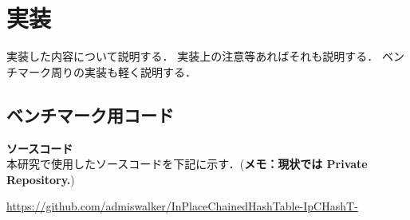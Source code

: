 \chapter{実装}
\label{chap_Implementation}

実装した内容について説明する．
実装上の注意等あればそれも説明する．
ベンチマーク周りの実装も軽く説明する．
\leavevmode \newline

\section{ベンチマーク用コード}

{\bf ソースコード}
\samepage \\ \indent
本研究で使用したソースコードを下記に示す．({\bf \color{red}メモ：現状では Private Repository.})
\begin{center}
  \url{https://github.com/admiswalker/InPlaceChainedHashTable-IpCHashT-}
\end{center}

